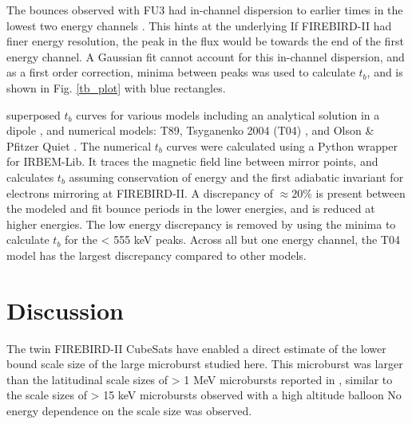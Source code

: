 \documentclass[draft, linenumbers]{agujournal}
\begin{document}
The bounces observed with FU3 had in-channel dispersion to earlier times in the lowest two energy channels . This  hints at the underlying  If FIREBIRD-II had finer energy resolution, the peak in the flux would be towards the  end of the first energy channel. A Gaussian fit cannot account for this in-channel dispersion, and as a first order correction, minima between peaks was used to calculate $t_b$, and is shown in Fig. \ref{tb_plot} with blue rectangles. 

 superposed  $t_b$ curves for various models including an analytical solution in a dipole \citep{Schulz1974}, and numerical models: T89, Tsyganenko 2004 (T04) \citep{Tsyganenko2005}, and Olson \& Pfitzer Quiet \citep{Olson1982} . The numerical $t_b$ curves were calculated using a Python wrapper for IRBEM-Lib. It traces the magnetic field line between mirror points, and calculates $t_b$ assuming conservation of energy and the first adiabatic invariant for electrons mirroring at FIREBIRD-II. A discrepancy of ${\approx} 20 \%$ is present between the modeled and fit bounce periods in the lower energies, and is reduced at higher energies. The low energy discrepancy is removed by using the minima to calculate $t_b$ for the < 555 keV peaks. Across all but one energy channel, the T04 model has the largest discrepancy compared to other models.

\section{Discussion} \label{discussion}
The twin FIREBIRD-II CubeSats have enabled a direct estimate of the lower bound scale size of the large microburst studied here. This microburst was larger than the latitudinal scale sizes of > 1 MeV microbursts reported in \citet{Blake1996},  similar to the scale sizes of > 15 keV microbursts observed with a high altitude balloon \citep{Parks1967}   No energy dependence on the scale size was observed.
\end{document}
